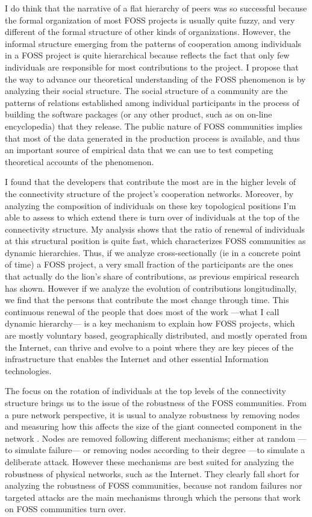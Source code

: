 I do think that the narrative of a flat hierarchy of peers was so successful because the formal organization of most FOSS projects is usually quite fuzzy, and very different of the formal structure of other kinds of organizations. However, the informal structure emerging from the patterns of cooperation among individuals in a FOSS project is quite hierarchical because reflects the fact that only few individuals are responsible for most contributions to the project. I propose that the way to advance our theoretical understanding of the FOSS phenomenon is by analyzing their social structure. The social structure of a community are the patterns of relations established among individual participants in the process of building the software packages (or any other product, such as on on-line encyclopedia) that they release. The public nature of FOSS communities implies that most of the data generated in the production process is available, and thus an important source of empirical data that we can use to test competing theoretical accounts of the phenomenon. 

I found that the developers that contribute the most are in the higher levels of the connectivity structure of the project's cooperation networks. Moreover, by analyzing the composition of individuals on these key topological positions I'm able to assess to which extend there is turn over of individuals at the top of the connectivity structure. My analysis shows that the ratio of renewal of individuals at this structural position is quite fast, which characterizes FOSS communities as dynamic hierarchies. Thus, if we analyze cross-sectionally (ie in a concrete point of time) a FOSS project, a very small fraction of the participants are the ones that actually do the lion's share of contributions, as previous empirical research has shown. However if we analyze the evolution of contributions longitudinally, we find that the persons that contribute the most change through time. This continuous renewal of the people that does most of the work ---what I call dynamic hierarchy--- is a key mechanism to explain how FOSS projects, which are mostly voluntary based, geographically distributed, and mostly operated from the Internet, can thrive and evolve to a point where they are key pieces of the infrastructure that enables the Internet and other essential Information technologies.

The focus on the rotation of individuals at the top levels of the connectivity structure brings us to the issue of the robustness of the FOSS communities. From a pure network perspective, it is usual to analyze robustness by removing nodes and measuring how this affects the size of the giant connected component in the network \citep{albert:2000}. Nodes are removed following different mechanisms; either at random ---to simulate failure--- or removing nodes according to their degree ---to simulate a deliberate attack. However these mechanisms are best suited for analyzing the robustness of physical networks, such as the Internet. They clearly fall short for analyzing the robustness of FOSS communities, because not random failures nor targeted attacks are the main mechanisms through which the persons that work on FOSS communities turn over.


